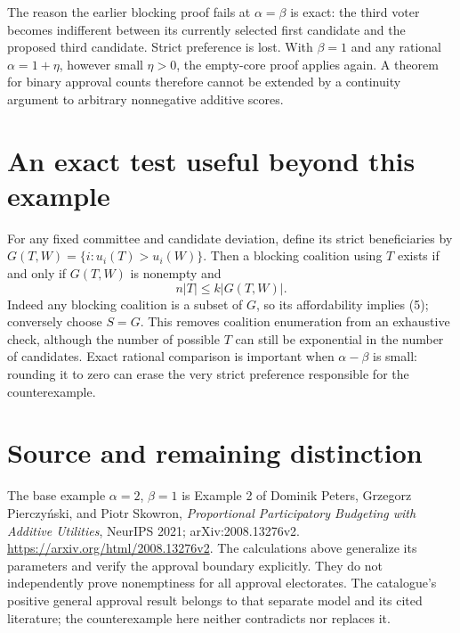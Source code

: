 \documentclass[11pt]{article}
\begin{document}
The reason the earlier blocking proof fails at $\alpha=\beta$ is exact:
the third voter becomes indifferent between its currently selected first
candidate and the proposed third candidate. Strict preference is lost.
With $\beta=1$ and any rational $\alpha=1+\eta$, however small
$\eta>0$, the empty-core proof applies again. A theorem for binary
approval counts therefore cannot be extended by a continuity argument
to arbitrary nonnegative additive scores.

\section*{An exact test useful beyond this example}
For any fixed committee and candidate deviation, define its strict
beneficiaries by $G(T,W)=\{i:u_i(T)>u_i(W)\}$. Then a blocking coalition
using $T$ exists if and only if $G(T,W)$ is nonempty and
\[
                              n|T|\leq k|G(T,W)|.                \tag{5}
\]
Indeed any blocking coalition is a subset of $G$, so its affordability
implies (5); conversely choose $S=G$. This removes coalition enumeration
from an exhaustive check, although the number of possible $T$ can still
be exponential in the number of candidates. Exact rational comparison
is important when $\alpha-\beta$ is small: rounding it to zero can erase
the very strict preference responsible for the counterexample.

\section*{Source and remaining distinction}
The base example $\alpha=2$, $\beta=1$ is Example 2 of Dominik Peters,
Grzegorz Pierczy\'nski, and Piotr Skowron,
\emph{Proportional Participatory Budgeting with Additive Utilities},
NeurIPS 2021; arXiv:2008.13276v2.
\url{https://arxiv.org/html/2008.13276v2}.
The calculations above generalize its parameters and verify the approval
boundary explicitly. They do not independently prove nonemptiness for
all approval electorates. The catalogue's positive general approval
result belongs to that separate model and its cited literature; the
counterexample here neither contradicts nor replaces it.
\end{document}
